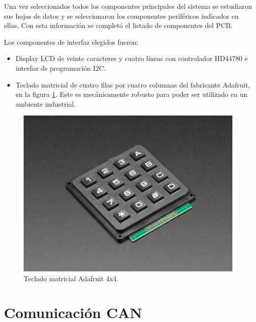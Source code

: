 Una vez seleccionados todos los componentes principales del sistema se estudiaron sus hojas de datos y se seleccionaron los componentes periféricos indicados en ellas. Con esta información se completó el listado de componentes del PCB.

Los componentes de interfaz elegidos fueron:
\begin{itemize}
	\item Display LCD de veinte caracteres y cuatro líneas con controlador HD44780 e interfaz de programación I2C. 
	\item Teclado matricial de cuatro filas por cuatro columnas del fabricante Adafruit\citep{web_adafruit}, en la figura \ref{fig:keypad}. Este es mecánicamente robusto para poder ser utilizado en un ambiente industrial. 
\end{itemize}


\begin{figure}[htbp]
	\centering
	\includegraphics[scale=.8]{./Figures/keypad.JPG}
	\caption{Teclado matricial Adafruit 4x4.}
	\label{fig:keypad}
\end{figure}



\section{Comunicación CAN}
\label{comunicacion_can}

